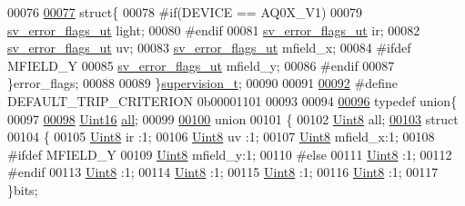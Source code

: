 \begin{DoxyCode}
00076 
\hypertarget{a00003_source_l00077}{}\hyperlink{a00003}{00077}   \textcolor{keyword}{struct}\{
00078 \textcolor{preprocessor}{#if(DEVICE == AQ0X\_V1)}
00079    \hyperlink{a00003_d2/df5/a00137}{sv\_error\_flags\_ut}        light;
00080 \textcolor{preprocessor}{#endif}
00081    \hyperlink{a00003_d2/df5/a00137}{sv\_error\_flags\_ut}        ir;
00082    \hyperlink{a00003_d2/df5/a00137}{sv\_error\_flags\_ut}        uv;
00083    \hyperlink{a00003_d2/df5/a00137}{sv\_error\_flags\_ut}        mfield\_x;
00084 \textcolor{preprocessor}{#ifdef MFIELD\_Y}
00085    \hyperlink{a00003_d2/df5/a00137}{sv\_error\_flags\_ut}        mfield\_y;
00086 \textcolor{preprocessor}{#endif}
00087   \}error\_flags;
00088 
00089 \}\hyperlink{a00003_d5/d5b/a00135}{supervision\_t};
00090 
00091 
\hypertarget{a00003_source_l00092}{}\hyperlink{a00003_a0ff9495f8521ea7698e83e7b4d6a6985}{00092} \textcolor{preprocessor}{#define DEFAULT\_TRIP\_CRITERION   0b00001101}
00093 
00094 
\hypertarget{a00003_source_l00096}{}\hyperlink{a00003}{00096} \textcolor{keyword}{typedef}  \textcolor{keyword}{union}\{
00097 
\hypertarget{a00003_source_l00098}{}\hyperlink{a00003_a3a4ea34ff84a869fc06d5088774a23dd}{00098}     \hyperlink{a00001_aae7407b021d43f7193a81a58cfb3e297}{Uint16} \hyperlink{a00003_a3a4ea34ff84a869fc06d5088774a23dd}{all};
00099 
\hypertarget{a00003_source_l00100}{}\hyperlink{a00003}{00100}     \textcolor{keyword}{union}
00101     \{
00102         \hyperlink{a00001_a979e3e23b9a449e69ab6a8a83b6042f8}{Uint8} all;
\hypertarget{a00003_source_l00103}{}\hyperlink{a00003}{00103}         \textcolor{keyword}{struct}
00104         \{
00105             \hyperlink{a00001_a979e3e23b9a449e69ab6a8a83b6042f8}{Uint8} ir      :1;
00106             \hyperlink{a00001_a979e3e23b9a449e69ab6a8a83b6042f8}{Uint8} uv      :1;
00107             \hyperlink{a00001_a979e3e23b9a449e69ab6a8a83b6042f8}{Uint8} mfield\_x:1;
00108 \textcolor{preprocessor}{            #ifdef MFIELD\_Y}
00109             \hyperlink{a00001_a979e3e23b9a449e69ab6a8a83b6042f8}{Uint8} mfield\_y:1;
00110 \textcolor{preprocessor}{            #else}
00111             \hyperlink{a00001_a979e3e23b9a449e69ab6a8a83b6042f8}{Uint8}         :1;
00112 \textcolor{preprocessor}{            #endif}
00113             \hyperlink{a00001_a979e3e23b9a449e69ab6a8a83b6042f8}{Uint8}         :1;
00114             \hyperlink{a00001_a979e3e23b9a449e69ab6a8a83b6042f8}{Uint8}         :1;
00115             \hyperlink{a00001_a979e3e23b9a449e69ab6a8a83b6042f8}{Uint8}         :1;
00116             \hyperlink{a00001_a979e3e23b9a449e69ab6a8a83b6042f8}{Uint8}         :1;
00117         \}bits;

\end{DoxyCode}
